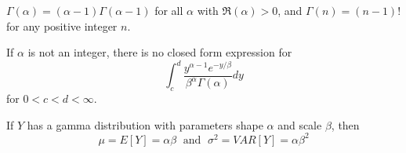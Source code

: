 \documentclass[12pt, a4paper, twoside, openright, titlepage]{book}
\begin{document}
\begin{props}{}{}
    $\Gamma(\alpha) = (\alpha-1)\Gamma(\alpha -1)$ for all $\alpha$ with $\mathfrak{R}(\alpha) > 0$, and $\Gamma(n) = (n-1)!$ for any positive integer $n$.
\end{props}

If $\alpha$ is not an integer, there is no closed form expression for \begin{equation*}
    \int_c^d\frac{y^{\alpha-1}e^{-y/\beta}}{\beta^{\alpha}\Gamma(\alpha)}dy
\end{equation*}
for $0 < c < d < \infty$.

\begin{thm}{}{}
    If $Y$ has a gamma distribution with parameters shape $\alpha$ and scale $\beta$, then \begin{equation*}
        \mu = E[Y] = \alpha\beta\;\text{ and }\;\sigma^2 = VAR[Y] = \alpha\beta^2
    \end{equation*}
\end{thm}
\end{document}
